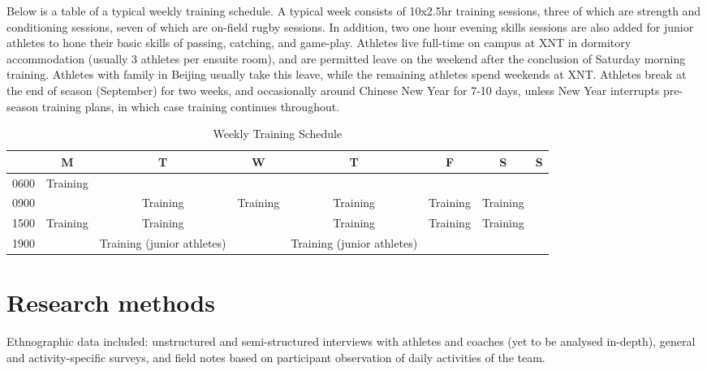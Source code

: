 Below is a table of a typical weekly training schedule. A typical week consists of 10x2.5hr training sessions, three of which are strength and conditioning sessions, seven of which are on-field rugby sessions.  In addition, two one hour evening skills sessions are also added for junior athletes to hone their basic skills of passing, catching, and game-play.  Athletes live full-time on campus at XNT in dormitory accommodation (usually 3 athletes per ensuite room), and are permitted leave on the weekend after the conclusion of Saturday morning training.  Athletes with family in Beijing usually take this leave, while the remaining athletes spend weekends at XNT.  Athletes break at the end of season (September) for two weeks, and occasionally around Chinese New Year for 7-10 days, unless New Year interrupts pre-season training plans, in which case training continues throughout.


\begin{table}[htpb]\caption{Weekly Training Schedule}
  \begin{center}
    \begin{small}
        \begin{tabular}{| c | c | c | c | c | c | c | c |}
          \hline
          & \bf M & \bf T & \bf W & \bf T & \bf F & \bf S & \bf S \\
          \hline
          0600 & Training &  &  & & & & \\
          \hline
          0900 &  & Training & Training & Training & Training & Training &  \\
            \hline
          1500 & Training & Training & & Training & Training & Training &  \\
            \hline
          1900 &  & Training (junior athletes) & & Training (junior athletes) & & & \\
             \hline
        \end{tabular}
      \end{small}
    \end{center}
  \end{table}


\section{Research methods}
Ethnographic data included: unstructured and semi-structured interviews with athletes and coaches (yet to be analysed in-depth), general and activity-specific surveys, and field notes based on participant observation of daily activities of the team.


